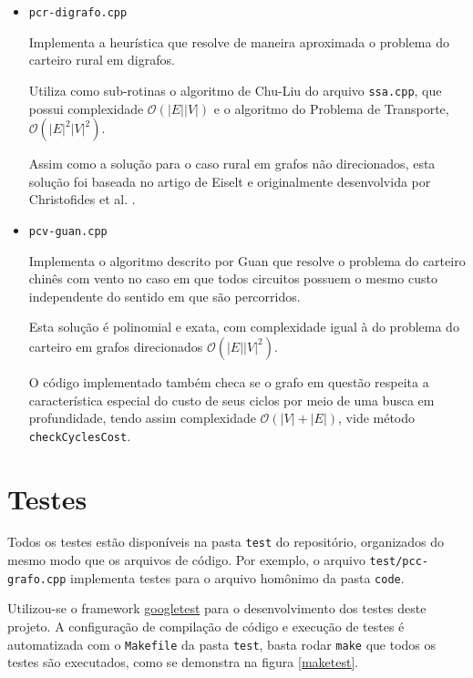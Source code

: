 \begin{itemize}
    \item \texttt{pcr-digrafo.cpp}

        Implementa a heurística que resolve de maneira aproximada o problema do carteiro rural em digrafos.

        Utiliza como sub-rotinas o algoritmo de Chu-Liu do arquivo \texttt{ssa.cpp}, que possui complexidade $\mathcal{O}(|E||V|)$ e o algoritmo do Problema de Transporte, $\mathcal{O}(|E|^2|V|^2)$.

        Assim como a solução para o caso rural em grafos não direcionados, esta solução foi baseada no artigo de Eiselt \cite{michel} e originalmente desenvolvida por Christofides et al. \cite{christofides-86}.
            
    \item \texttt{pcv-guan.cpp}

        Implementa o algoritmo descrito por Guan \cite{guan-windy} que resolve o problema do carteiro chinês com vento no caso em que todos circuitos possuem o mesmo custo independente do sentido em que são percorridos.
        
        Esta solução é polinomial e exata, com complexidade igual à do problema do carteiro em grafos direcionados $\mathcal{O}(|E||V|^2)$.
        
        O código implementado também checa se o grafo em questão respeita a característica especial do custo de seus ciclos por meio de uma busca em profundidade, tendo assim complexidade $\mathcal{O}(|V| + |E|)$, vide método \texttt{checkCyclesCost}.

\end{itemize}

\section{Testes}

Todos os testes estão disponíveis na pasta \texttt{test} do repositório, organizados do mesmo modo que os arquivos de código.
Por exemplo, o arquivo \texttt{test/pcc-grafo.cpp} implementa testes para o arquivo homônimo da pasta \texttt{code}.


Utilizou-se o framework \href{https://github.com/google/googletest}{googletest} para o desenvolvimento dos testes deste projeto.
A configuração de compilação de código e execução de testes é automatizada com o \texttt{Makefile} da pasta \texttt{test}, basta rodar \texttt{make} que todos os testes são executados, como se demonstra na figura \ref{maketest}.

